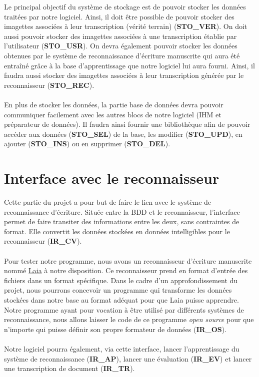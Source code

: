 Le principal objectif du système de stockage est de pouvoir stocker les données
traitées par notre logiciel. Ainsi, il doit être possible de pouvoir stocker
des imagettes associées à leur transcription (vérité terrain) (\textbf{STO\_VER}).
On doit aussi pouvoir stocker des imagettes associées à une transcription établie
par l’utilisateur (\textbf{STO\_USR}). On devra également pouvoir stocker les
données obtenues par le système de reconnaissance d’écriture manuscrite qui aura
été entraîné grâce à la base d’apprentissage que notre logiciel lui aura fourni.
Ainsi, il faudra aussi stocker des imagettes associées à leur transcription
générée par le reconnaisseur (\textbf{STO\_REC}).

\paragraph{}
En plus de stocker les données, la partie base de données devra pouvoir
communiquer facilement avec les autres blocs de notre logiciel (IHM et
préparateur de données). Il faudra ainsi fournir une bibliothèque afin 
de pouvoir accéder aux données (\textbf{STO\_SEL}) de la base, les modifier
(\textbf{STO\_UPD}), en ajouter (\textbf{STO\_INS}) ou en supprimer
(\textbf{STO\_DEL}).

\section{Interface avec le reconnaisseur}

Cette partie du projet a pour but de faire le lien avec le système de
reconnaissance d’écriture. Située entre la BDD et le reconnaisseur,
l’interface permet de faire transiter des informations entre les deux, sans
contraintes de format. Elle convertit les données stockées en données
intelligibles pour le reconnaisseur (\textbf{IR\_CV}).

\paragraph{}
Pour tester notre programme, nous avons un reconnaisseur d’écriture
manuscrite nommé
\href{https://github.com/jpuigcerver/Laia/tree/master/egs/iam}{Laia} à notre
disposition. Ce reconnaisseur prend en format d’entrée des fichiers dans un
format spécifique. Dans le cadre d'un approfondissement du projet, nous
pourrons concevoir un programme qui transforme les
données stockées dans notre base au format adéquat pour que Laia puisse
apprendre. Notre programme ayant pour vocation à être utilisé par différents
systèmes de reconnaissance, nous allons laisser le code de ce programme
\textit{open source} pour que n’importe qui puisse définir son propre
formateur de données (\textbf{IR\_OS}).

\paragraph{}
Notre logiciel pourra également, via cette interface, lancer
l’apprentissage du système de reconnaissance (\textbf{IR\_AP}), lancer une
évaluation (\textbf{IR\_EV}) et lancer une transcription de document
(\textbf{IR\_TR}).
